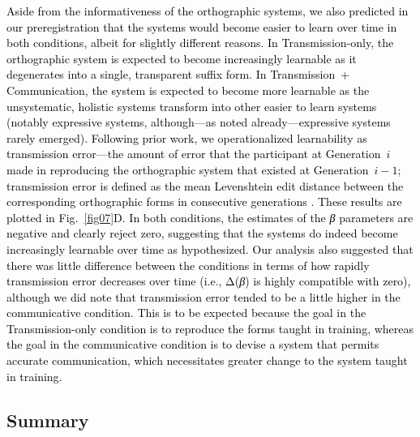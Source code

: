 \documentclass[doc,biblatex]{apa7}
\newcommand\newmaterial[1]{\textcolor{black}{#1}}
\newcommand\secondrevision[1]{\textcolor{black}{#1}}
\begin{document}
\newmaterial{Aside from the informativeness of the orthographic systems, we also predicted in our preregistration that the systems would become easier to learn over time in both conditions, albeit for slightly different reasons. In Transmission-only, the orthographic system is expected to become increasingly learnable as it degenerates into a single, transparent suffix form. In Transmission~+ Communication, the system is expected to become more learnable as the unsystematic, holistic systems transform into other easier to learn systems (notably expressive systems, although---as noted already---expressive systems rarely emerged). Following prior work, we operationalized learnability as transmission error---the amount of error that the participant at Generation~$i$ made in reproducing the orthographic system that existed at Generation~$i-1$; transmission error is defined as the mean Levenshtein edit distance between the corresponding orthographic forms in consecutive generations \parencite[see e.g.,][]{Kirby:2008}. These results are plotted in Fig.~\ref{fig07}D. In both conditions, the estimates of the \textit{β} parameters are negative and clearly reject zero, suggesting that the systems do indeed become increasingly learnable over time \secondrevision{as hypothesized. Our analysis also suggested that there was little difference between the conditions in terms of how rapidly transmission error decreases over time (i.e., Δ(\textit{β}) is highly compatible with zero), although we did note that transmission error tended to be a little higher in the communicative condition.} This is to be expected because the goal in the Transmission-only condition is to reproduce the forms taught in training, whereas the goal in the communicative condition is to devise a system that permits accurate communication, which necessitates greater change to the system taught in training.}

\subsection{Summary}
\end{document}
